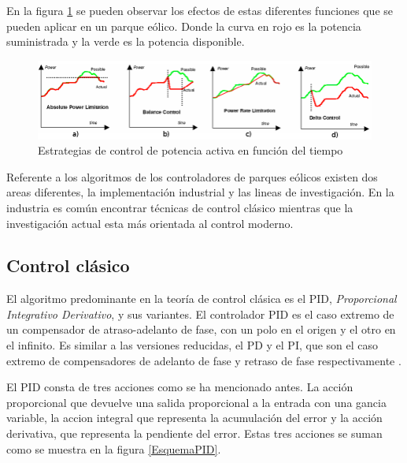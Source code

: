 \documentclass{book}
\begin{document}
En la figura \ref{PowerLimits} se pueden observar los efectos de estas diferentes funciones que se pueden aplicar en un parque e\'olico. Donde la curva en rojo es la potencia suministrada y la verde es la potencia disponible. \par 


\begin{figure}[h!]
\centering
\includegraphics[width=1\textwidth]{PowerLimits.PNG}
\caption{Estrategias de control de potencia activa en funci\'on del tiempo}
\label{PowerLimits}
\end{figure}

Referente a los algoritmos de los controladores de parques e\'olicos existen dos areas diferentes, la implementaci\'on industrial y las lineas de investigaci\'on. En la industria es com\'un encontrar t\'ecnicas de control cl\'asico mientras que la investigaci\'on actual esta m\'as orientada al control moderno. \par 

	\subsection{Control cl\'asico}

El algoritmo predominante en la teor\'ia de control cl\'asica es el PID, \emph{Proporcional Integrativo Derivativo}, y sus variantes. El controlador PID es el caso extremo de un compensador de atraso-adelanto de fase, con un polo en el origen y el otro en el infinito. Es similar a las versiones reducidas, el PD y el PI, que son el caso extremo de compensadores de adelanto de fase y retraso de fase respectivamente \cite{PIDanalysis}. \par

El PID consta de tres acciones como se ha mencionado antes. La acci\'on proporcional que devuelve una salida proporcional a la entrada con una gancia variable, la accion integral que representa la acumulaci\'on del error y la acci\'on derivativa, que representa la pendiente del error. Estas tres acciones se suman como se muestra en la figura \ref{EsquemaPID}. \par

\end{document}
